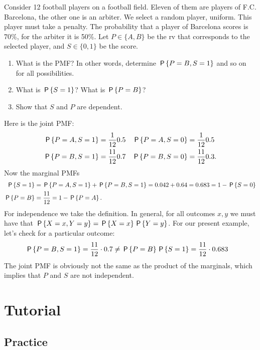 \begin{exercise}
Consider 12 football players on a football field.
Eleven of them are players of F.C. Barcelona, the other one is an arbiter.
We select a random player, uniform.
This player must take a penalty.
The probability that a player of Barcelona scores is 70\%, for the arbiter it is 50\%.
Let $P\in \{A, B\}$ be the rv that corresponds to the selected player, and $S\in\{0,1\}$ be the score.
\begin{enumerate}
\item What is the PMF? In other words, determine $\P{P = B, S=1}$ and so on for all possibilities.
\item What is $\P{S=1}$? What is $\P{P=B}$?
\item Show that $S$ and $P$ are dependent.
\end{enumerate}
\begin{solution}
Here is the joint PMF:
\begin{align}
\P{P=A, S=1} &= \frac{1}{12}0.5 & \P{P=A, S=0} &= \frac{1}{12}0.5 \\
\P{P=B, S=1} &= \frac{11}{12}0.7 & \P{P=B, S=0} &= \frac{11}{12}0.3.
\end{align}
Now the marginal PMFs
\begin{align*}
\P{S=1}  &= \P{P=A, S=1} + \P{P=B, S=1} = 0.042 + 0.64 = 0.683 = 1-\P{S=0}\\
\P{P=B}  &= \frac{11}{12} = 1-\P{P=A}.
\end{align*}
For independence we take the definition.
In general, for all outcomes $x,y$ we must have that $\P{X=x, Y=y} = \P{X=x}\P{Y=y}$.
For our present example, let's check for  a particular outcome:
\begin{align*}
\P{P=B, S=1} &= \frac{11}{12}\cdot0.7 \neq \P{P=B}\P{S=1} = \frac{11}{12} \cdot 0.683
\end{align*}
The joint PMF is obviously not the same as the product of the marginals, which implies that $P$ and $S$ are not independent.
\end{solution}
\end{exercise}


\section{Tutorial}
\label{sec:tutorial}

\subsection{Practice}


